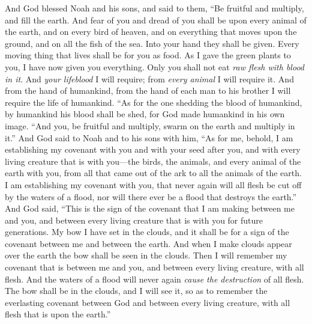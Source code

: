 \begin{biblechapter} %
 And God blessed Noah and his sons, and said to them, “Be fruitful and multiply, and fill the earth.
\verse And fear of you and dread of you shall be upon every animal of the earth, and on every bird of heaven, and on everything that moves upon the ground, and on all the fish of the sea. Into your hand they shall be given.
\verse Every moving thing that lives shall be for you as food. As I gave the green plants to you, I have now given you everything.
\verse Only you shall not eat \textit{raw flesh with blood in it}.
\verse And \textit{your lifeblood} I will require; from \textit{every animal} I will require it. And from the hand of humankind, from the hand of each man to his brother I will require the life of humankind.
\verse “As for the one shedding the blood of humankind, 
by humankind his blood shall be shed, 
for God made humankind in his own image.
\verse “And you, be fruitful and multiply, swarm on the earth and multiply in it.”
\verse And God said to Noah and to his sons with him,
\verse “As for me, behold, I am establishing my covenant with you and with your seed after you,
\verse and with every living creature that is with you—the birds, the animals, and every animal of the earth with you, from all that came out of the ark to all the animals of the earth.
\verse I am establishing my covenant with you, that never again will all flesh be cut off by the waters of a flood, nor will there ever be a flood that destroys the earth.”
\verse And God said, “This is the sign of the covenant that I am making between me and you, and between every living creature that is with you for future generations.
\verse My bow I have set in the clouds, and it shall be for a sign of the covenant between me and between the earth.
\verse And when I make clouds appear over the earth the bow shall be seen in the clouds.
\verse Then I will remember my covenant that is between me and you, and between every living creature, with all flesh. And the waters of a flood will never again \textit{cause the destruction} of all flesh.
\verse The bow shall be in the clouds, and I will see it, so as to remember the everlasting covenant between God and between every living creature, with all flesh that is upon the earth.”

\end{biblechapter}
